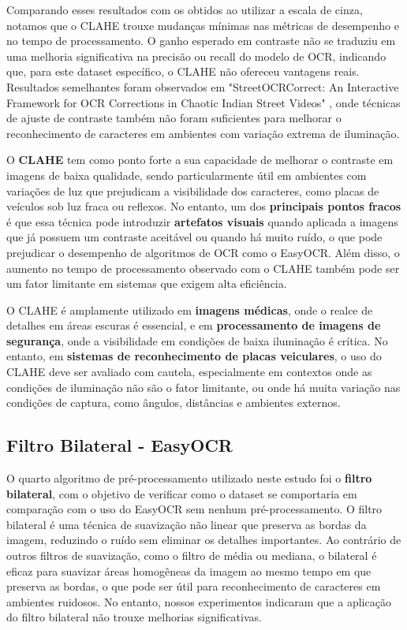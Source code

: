 \documentclass[conference]{IEEEtran}
\begin{document}
Comparando esses resultados com os obtidos ao utilizar a escala de cinza, notamos que o CLAHE trouxe mudanças mínimas nas métricas de desempenho e no tempo de processamento. O ganho esperado em contraste não se traduziu em uma melhoria significativa na precisão ou recall do modelo de OCR, indicando que, para este dataset específico, o CLAHE não ofereceu vantagens reais. Resultados semelhantes foram observados em "StreetOCRCorrect: An Interactive Framework for OCR Corrections in Chaotic Indian Street Videos" \cite{b13}, onde técnicas de ajuste de contraste também não foram suficientes para melhorar o reconhecimento de caracteres em ambientes com variação extrema de iluminação.

O \textbf{CLAHE} tem como ponto forte a sua capacidade de melhorar o contraste em imagens de baixa qualidade, sendo particularmente útil em ambientes com variações de luz que prejudicam a visibilidade dos caracteres, como placas de veículos sob luz fraca ou reflexos. No entanto, um dos \textbf{principais pontos fracos} é que essa técnica pode introduzir \textbf{artefatos visuais} quando aplicada a imagens que já possuem um contraste aceitável ou quando há muito ruído, o que pode prejudicar o desempenho de algoritmos de OCR como o EasyOCR. Além disso, o aumento no tempo de processamento observado com o CLAHE também pode ser um fator limitante em sistemas que exigem alta eficiência.

O CLAHE é amplamente utilizado em \textbf{imagens médicas}, onde o realce de detalhes em áreas escuras é essencial, e em \textbf{processamento de imagens de segurança}, onde a visibilidade em condições de baixa iluminação é crítica. No entanto, em \textbf{sistemas de reconhecimento de placas veiculares}, o uso do CLAHE deve ser avaliado com cautela, especialmente em contextos onde as condições de iluminação não são o fator limitante, ou onde há muita variação nas condições de captura, como ângulos, distâncias e ambientes externos.

\subsection{Filtro Bilateral - EasyOCR}

O quarto algoritmo de pré-processamento utilizado neste estudo foi o \textbf{filtro bilateral}, com o objetivo de verificar como o dataset se comportaria em comparação com o uso do EasyOCR sem nenhum pré-processamento. O filtro bilateral é uma técnica de suavização não linear que preserva as bordas da imagem, reduzindo o ruído sem eliminar os detalhes importantes. Ao contrário de outros filtros de suavização, como o filtro de média ou mediana, o bilateral é eficaz para suavizar áreas homogêneas da imagem ao mesmo tempo em que preserva as bordas, o que pode ser útil para reconhecimento de caracteres em ambientes ruidosos. No entanto, nossos experimentos indicaram que a aplicação do filtro bilateral não trouxe melhorias significativas.
\end{document}
